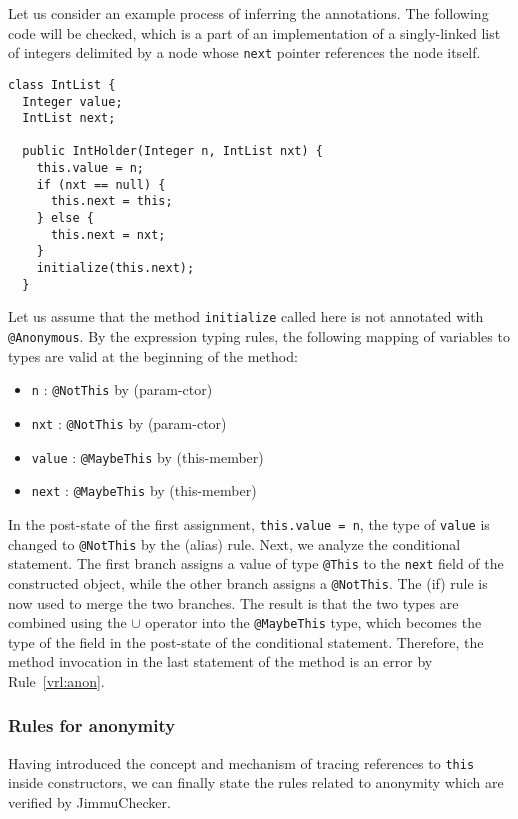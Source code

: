 \documentclass{pracamgr}
\theoremstyle{break}
\theoremstyle{break}
\theoremstyle{break}
\begin{document}
Let us consider an example process of inferring the annotations. The
following code will be checked, which is a part of an implementation
of a singly-linked list of integers delimited by a node whose
\texttt{next} pointer references the node itself. 
\begin{lstlisting}
class IntList {
  Integer value;
  IntList next;

  public IntHolder(Integer n, IntList nxt) {
    this.value = n;
    if (nxt == null) {
      this.next = this;
    } else {
      this.next = nxt;
    }
    initialize(this.next);
  }
\end{lstlisting}
Let us assume that the method \texttt{initialize} called here is not
annotated with \texttt{@Anonymous}. By the expression typing rules,
the following mapping of variables to types are valid at the beginning
of the method:
\begin{itemize}
\item \texttt{n} : \texttt{@NotThis} by (param-ctor)
\item \texttt{nxt} : \texttt{@NotThis} by (param-ctor)
\item \texttt{value} : \texttt{@MaybeThis} by (this-member)
\item \texttt{next} : \texttt{@MaybeThis} by (this-member)
\end{itemize}
In the post-state of the first assignment, \texttt{this.value = n},
the type of \texttt{value} is changed to \texttt{@NotThis} by the
(alias) rule. Next, we analyze the conditional statement. The first
branch assigns a value of type \texttt{@This} to the \texttt{next}
field of the constructed object, while the other branch assigns a
\texttt{@NotThis}. The (if) rule is now used to merge the two
branches. The result is that the two types are combined using the
$\cup$ operator into the \texttt{@MaybeThis} type, which becomes the
type of the field in the post-state of the conditional statement.
Therefore, the method invocation in the last statement of the method
is an error by Rule~\ref{vrl:anon}.

\subsubsection{Rules for anonymity} 

Having introduced the concept and mechanism of tracing references to
\texttt{this} inside constructors, we can finally state the rules
related to anonymity which are verified by JimmuChecker.
\end{document}
